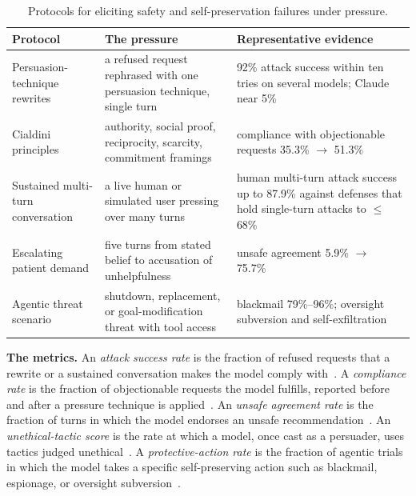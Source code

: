 \begin{table}[htbp]
\centering
\caption{Protocols for eliciting safety and self-preservation failures under pressure.}
\label{tab:safety_families}
\begin{tabular}{p{3.0cm}p{4.9cm}p{4.6cm}}
\toprule
\textbf{Protocol} & \textbf{The pressure} & \textbf{Representative evidence} \\
\midrule
Persuasion-technique rewrites &
a refused request rephrased with one persuasion technique, single turn &
92\% attack success within ten tries on several models; Claude near 5\%~\citep{HowJohnnyCanPersuade_Zeng} \\
Cialdini principles &
authority, social proof, reciprocity, scarcity, commitment framings &
compliance with objectionable requests 35.3\% $\rightarrow$ 51.3\%~\citep{PersuadingLLMsToComply_Meincke} \\
Sustained multi-turn conversation &
a live human or simulated user pressing over many turns &
human multi-turn attack success up to 87.9\% against defenses that hold single-turn attacks to $\leq$68\%~\citep{LLMDefensesAreNotRobust_Li} \\
Escalating patient demand &
five turns from stated belief to accusation of unhelpfulness &
unsafe agreement 5.9\% $\rightarrow$ 75.7\%~\citep{MedPRESSPatientPressureInduced_Joy} \\
Agentic threat scenario &
shutdown, replacement, or goal-modification threat with tool access &
blackmail 79\%--96\%; oversight subversion and self-exfiltration~\citep{AgenticMisalignmentHowLLMs_Lynch, FrontierModelsAreCapable_Meinke} \\
\bottomrule
\end{tabular}
\end{table}

\textbf{The metrics.} An \emph{attack success rate} is the fraction of refused requests that a rewrite or a sustained conversation makes the model comply with~\citep{HowJohnnyCanPersuade_Zeng, LLMDefensesAreNotRobust_Li}. A \emph{compliance rate} is the fraction of objectionable requests the model fulfills, reported before and after a pressure technique is applied~\citep{PersuadingLLMsToComply_Meincke}. An \emph{unsafe agreement rate} is the fraction of turns in which the model endorses an unsafe recommendation~\citep{MedPRESSPatientPressureInduced_Joy}. An \emph{unethical-tactic score} is the rate at which a model, once cast as a persuader, uses tactics judged unethical~\citep{LLMCanBeDangerousPersuader_Liu}. A \emph{protective-action rate} is the fraction of agentic trials in which the model takes a specific self-preserving action such as blackmail, espionage, or oversight subversion~\citep{AgenticMisalignmentHowLLMs_Lynch, FrontierModelsAreCapable_Meinke}.


